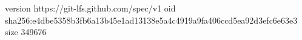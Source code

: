 version https://git-lfs.github.com/spec/v1
oid sha256:e4dbe5358b3fb6a13b45e1ad13138e5a4c4919a9fa406ccd5ea92d3efc6e63e3
size 349676
